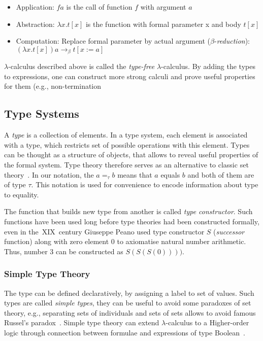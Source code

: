 \documentclass[article]{aaltoseries}
\begin{document}
\begin{itemize}
\itemsep0em
	\item Application:
	$f a$ is the call of function $f$ with argument $a$
	
	\item Abstraction:
	$\lambda x.t[x]$ is the function with formal parameter x and body $t[x]$
	
	\item Computation:
	Replace formal parameter by actual argument ($\beta$-\textit{reduction}): \\
	$(\lambda x.t[x]) a \rightarrow_{\beta} t[x:=a]$
\end{itemize}

$\lambda$-calculus described above is called the \textit{type-free} $\lambda$-calculus. By adding the types to expressions, one can construct more strong calculi and prove useful properties for them (e.g., non-termination 


\subsection{Type Systems}

A \textit{type} is a collection of elements. In a type system, each element is associated with a type, which restricts set of possible operations with this element. Types can be thought as a structure of objects, that allows to reveal useful properties of the formal system. Type theory therefore serves as an alternative to classic set theory~\cite{Tho91}.
In our notation, the $a =_{\tau} b$ means that $a$ equals $b$ and both of them are of type $\tau$. This notation is used for convenience to encode information about type to equality.

The function that builds new type from another is called \textit{type constructor}. Such functions have been used long before type theories had been constructed formally, even in the~XIX~century Giuseppe Peano used type constructor $S$ (\textit{successor} function) along with zero element 0 to axiomatise natural number arithmetic. Thus, number 3 can be constructed as $S(S(S(0))))$.


\subsubsection{Simple Type Theory}
The type can be defined declaratively, by assigning a label to set of values. Such types are called \textit{simple types}, they can be useful to avoid some paradoxes of set theory, e.g., separating sets of individuals and sets of sets allows to avoid famous Russel's paradox~\cite{Irv95}. Simple type theory can extend $\lambda$-calculus to a Higher-order logic through connection between formulae and expressions of type Boolean~\cite{Paulson90}.
\end{document}
